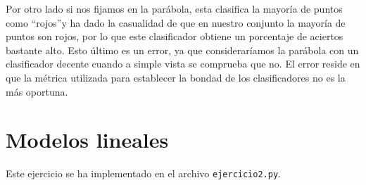 \documentclass[size=a4, parskip=half, titlepage=false, toc=flat, toc=bib, 12pt]{scrartcl}
\begin{document}
\begin{enumerate}
\begin{enumerate}
Por otro lado si nos fijamos en la parábola, esta clasifica la mayoría de puntos como ``rojos''y ha dado la casualidad de que en nuestro conjunto la mayoría de puntos son rojos, por lo que este clasificador obtiene un porcentaje de aciertos bastante alto. Esto último es un error, ya que consideraríamos la parábola con un clasificador decente cuando a simple vista se comprueba que no. El error reside en  que la métrica utilizada para establecer la bondad de los clasificadores no es la más oportuna.

\end{enumerate}
\end{enumerate}

\section{Modelos lineales}
Este ejercicio se ha implementado en el archivo \verb|ejercicio2.py|.
\end{document}

